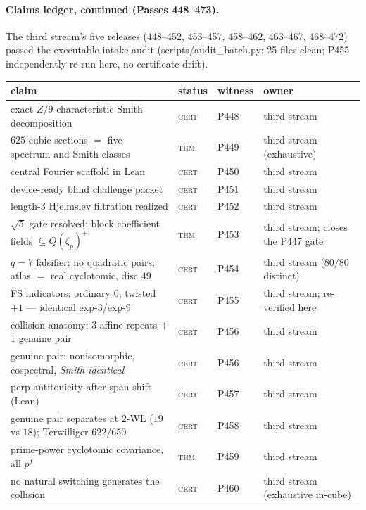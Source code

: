 \documentclass[12pt,a4paper]{article}
\def\mathbb#1{#1}%
\def\mathbf#1{#1}%
\def\texttt#1{#1}%
\theoremstyle{definition}
\newcommand{\ZZ}{\mathbb{Z}}
\begin{document}
\paragraph{Claims ledger, continued (Passes 448--473).}
The third stream's five releases (448--452, 453--457, 458--462, 463--467,
468--472) passed the executable intake audit
(\texttt{scripts/audit\_batch.py}: 25 files clean; P455 independently
re-run here, no certificate drift).

\begin{center}\small
\begin{tabular}{@{}p{}llp{}@{}}
\toprule
claim & status & witness & owner \\
\midrule
exact $\ZZ/9$ characteristic Smith decomposition & \textsc{cert} & P448 & third stream \\
$625$ cubic sections $=$ five spectrum-and-Smith classes & \textsc{thm} & P449 & third stream (exhaustive) \\
central Fourier scaffold in Lean & \textsc{cert} & P450 & third stream \\
device-ready blind challenge packet & \textsc{cert} & P451 & third stream \\
length-$3$ Hjelmslev filtration realized & \textsc{cert} & P452 & third stream \\
$\sqrt5$ gate resolved: block coefficient fields $\subseteq\mathbf Q(\zeta_p)^+$ & \textsc{thm} & P453 & third stream; closes the P447 gate \\
$q{=}7$ falsifier: no quadratic pairs; atlas $=$ real cyclotomic, disc $49$ & \textsc{cert} & P454 & third stream ($80/80$ distinct) \\
FS indicators: ordinary $0$, twisted $+1$ --- identical exp-$3$/exp-$9$ & \textsc{cert} & P455 & third stream; re-verified here \\
collision anatomy: $3$ affine repeats $+$ $1$ genuine pair & \textsc{cert} & P456 & third stream \\
genuine pair: nonisomorphic, cospectral, \emph{Smith-identical} & \textsc{cert} & P456 & third stream \\
perp antitonicity after span shift (Lean) & \textsc{cert} & P457 & third stream \\
genuine pair separates at $2$-WL ($19$ vs $18$); Terwilliger $622/650$ & \textsc{cert} & P458 & third stream \\
prime-power cyclotomic covariance, all $p^f$ & \textsc{thm} & P459 & third stream \\
no natural switching generates the collision & \textsc{cert} & P460 & third stream (exhaustive in-cube) \\

\end{tabular}
\end{center}
\end{document}
